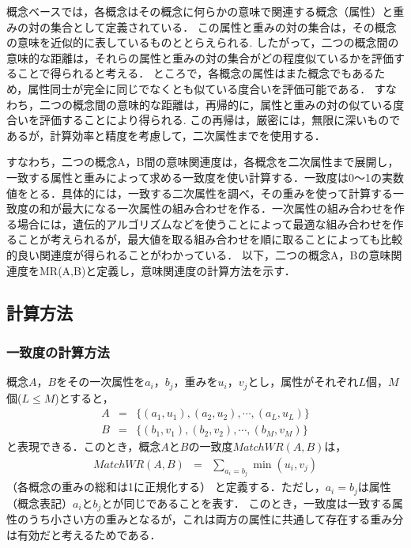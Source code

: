 概念ベースでは，各概念はその概念に何らかの意味で関連する概念（属性）と重みの対の集合として定義されている．
この属性と重みの対の集合は，その概念の意味を近似的に表しているものととらえられる.
したがって，二つの概念間の意味的な距離は，それらの属性と重みの対の集合がどの程度似ているかを評価することで得られると考える．
ところで，各概念の属性はまた概念でもあるため，属性同士が完全に同じでなくとも似ている度合いを評価可能である．
すなわち，二つの概念間の意味的な距離は，再帰的に，属性と重みの対の似ている度合いを評価することにより得られる.
この再帰は，厳密には，無限に深いものであるが，計算効率と精度を考慮して，二次属性までを使用する．

すなわち，二つの概念A，B間の意味関連度は，各概念を二次属性まで展開し，一致する属性と重みによって求める一致度を使い計算する．一致度は0〜1の実数値をとる．具体的には，一致する二次属性を調べ，その重みを使って計算する一致度の和が最大になる一次属性の組み合わせを作る．一次属性の組み合わせを作る場合には，遺伝的アルゴリズムなどを使うことによって最適な組み合わせを作ることが考えられるが，最大値を取る組み合わせを順に取ることによっても比較的良い関連度が得られることがわかっている\cite{Ukita}．
以下，二つの概念A，Bの意味関連度をMR(A,B)と定義し，意味関連度の計算方法を示す．

\subsection{計算方法}

\subsubsection{一致度の計算方法}

概念$A$，$B$をその一次属性を$a_i$，$b_j$，重みを$u_i$，$v_j$とし，属性がそれぞれ$L$個，$M$個($L \le M$)とすると，
\begin{eqnarray}
A &=& \{ (a_1, u_1), (a_2, u_2), \cdots, (a_L, u_L) \} \\
B &=& \{ (b_1, v_1), (b_2, v_2), \cdots, (b_M, v_M) \}
\end{eqnarray}
と表現できる．このとき，概念$A$と$B$の一致度$MatchWR(A,B)$は，
\begin{eqnarray}
MatchWR(A,B) &=& \sum_{a_i=b_j} \min(u_i,v_j)
\end{eqnarray}
（各概念の重みの総和は1に正規化する）
と定義する．ただし，$a_i=b_j$は属性（概念表記）$a_i$と$b_j$とが同じであることを表す．
このとき，一致度は一致する属性のうち小さい方の重みとなるが，これは両方の属性に共通して存在する重み分は有効だと考えるためである．

